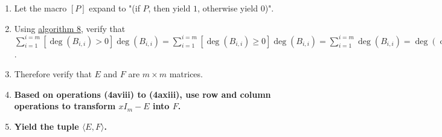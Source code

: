\documentclass[twocolumn]{article}
\begin{document}
\begin{enumerate}
\begin{enumerate}
\begin{enumerate}
						\item Verify that $D$ is now a diagonal matrix whose first $k-1$ diagonal entries are $1$ and whose last diagonal entry is $p$.
						\item Add $k$ columns filled with zeros to the right end of $F$.
						\item Add k rows filled with zeros to the bottom end of $F$.
						\item Set the bottom-right corner of $F$ equal to $D$.
					\end{enumerate}
					\item Otherwise if $k=0$, then do the following:
					\begin{enumerate}
						\item Verify that $p$ is monic.
						\item Verify that $p=1$.
					\end{enumerate}
					\item Otherwise do the following:
					\begin{enumerate}
						\item \textbf{Abort algorithm.}
					\end{enumerate}
				\end{enumerate}
				\item Let the macro $[P]$ expand to "(if $P$, then yield $1$, otherwise yield $0$)".
				\item Using \hyperref[sec:algorithm 8]{algorithm 8}, verify that $\sum_{i=1}^{i=m}[\deg(B_{i,i})>0]\deg(B_{i,i})=\sum_{i=1}^{i=m}[\deg(B_{i,i})\ge 0]\deg(B_{i,i})=\sum_{i=1}^{i=m}\deg(B_{i,i})=\deg(\det(B))=\deg(\det(xI_m-A))=m$.
				\item Therefore verify that $E$ and $F$ are $m\times m$ matrices.
				\item \textbf{Based on operations (4aviii) to (4axiii), use row and column operations to transform $xI_m-E$ into $F$.}
				\item \textbf{Yield the tuple $\langle E, F\rangle$.}
			\end{enumerate}
\end{document}
